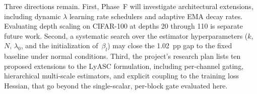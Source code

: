 \documentclass[conference,10pt]{IEEEtran}
\begin{document}
Three directions remain. First, Phase~F will investigate
architectural extensions, including dynamic $\lambda$ learning rate
schedulers and adaptive EMA decay rates. Evaluating depth scaling on
CIFAR-100 at depths 20 through 110 is separate future work.
Second, a systematic search over the estimator hyperparameters ($k$,
$N$, $\lambda_0$, and the initialization of~$\beta_l$) may close the
1.02~pp gap to the fixed baseline under normal conditions. Third, the
project's research plan lists ten proposed extensions to the LyASC
formulation, including per-channel gating, hierarchical multi-scale
estimators, and explicit coupling to the training loss Hessian, that go
beyond the single-scalar, per-block gate evaluated here.




\end{document}

